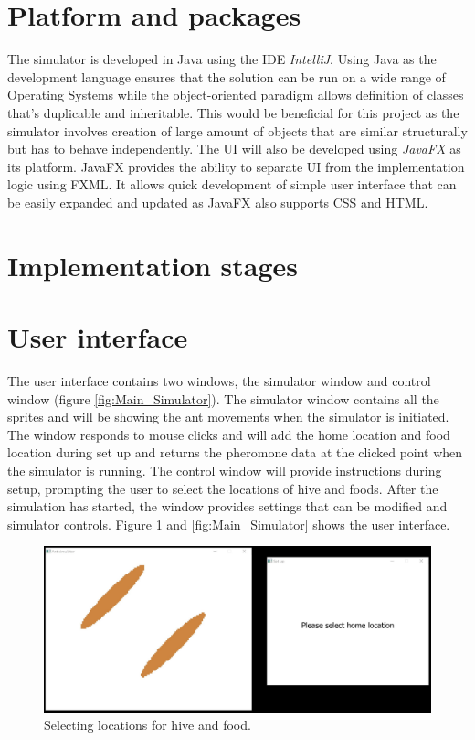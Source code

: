 \documentclass[a4paper, oneside, 11pt]{report}
\begin{document}
\section{Platform and packages}
The simulator is developed in Java using the IDE \textit{IntelliJ}. Using Java as the development language ensures that the solution can be run on a wide range of Operating Systems while the object-oriented paradigm allows definition of classes that's duplicable and inheritable. This would be beneficial for this project as the simulator involves creation of large amount of objects that are similar structurally but has to behave independently. The UI will also be developed using \textit{JavaFX} as its platform. JavaFX provides the ability to separate UI from the implementation logic using FXML. It allows quick development of simple user interface that can be easily expanded and updated as JavaFX also supports CSS and HTML.

\section{Implementation stages}


\section{User interface}
The user interface contains two windows, the simulator window and control window (figure \ref{fig:Main_Simulator}). The simulator window contains all the sprites and will be showing the ant movements when the simulator is initiated. The window responds to mouse clicks and will add the home location and food location during set up and returns the pheromone data at the clicked point when the simulator is running. The control window will provide instructions during setup, prompting the user to select the locations of hive and foods. After the simulation has started, the window provides settings that can be modified and simulator controls. Figure \ref{fig:Location_Selection} and \ref{fig:Main_Simulator} shows the user interface.
\begin{figure}[htb]
	\begin{center}
		\includegraphics[width=1.0 \columnwidth]{Location_Selection.jpg}
		\caption{Selecting locations for hive and food.}
		\label{fig:Location_Selection}
	\end{center}
\end{figure}
\end{document}
